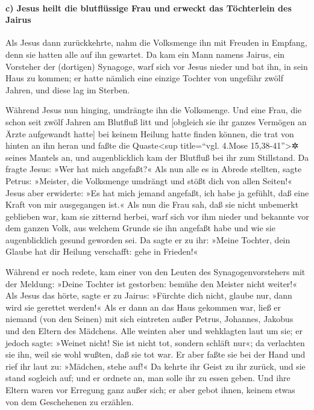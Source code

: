 \hypertarget{c-jesus-heilt-die-blutfluxfcssige-frau-und-erweckt-das-tuxf6chterlein-des-jairus}{%
\paragraph{c) Jesus heilt die blutflüssige Frau und erweckt das
Töchterlein des
Jairus}\label{c-jesus-heilt-die-blutfluxfcssige-frau-und-erweckt-das-tuxf6chterlein-des-jairus}}

 Als Jesus dann zurückkehrte, nahm die Volksmenge ihn mit
Freuden in Empfang, denn sie hatten alle auf ihn gewartet.
 Da kam ein Mann namens Jairus, ein Vorsteher der
(dortigen) Synagoge, warf sich vor Jesus nieder und bat ihn, in sein
Haus zu kommen;  er hatte nämlich eine einzige Tochter
von ungefähr zwölf Jahren, und diese lag im Sterben.

Während Jesus nun hinging, umdrängte ihn die Volksmenge. 
Und eine Frau, die schon seit zwölf Jahren am Blutfluß litt und
{[}obgleich sie ihr ganzes Vermögen an Ärzte aufgewandt hatte{]} bei
keinem Heilung hatte finden können,  die trat von hinten
an ihn heran und faßte die Quaste\textless sup title=``vgl. 4.Mose
15,38-41''\textgreater✲ seines Mantels an, und augenblicklich kam der
Blutfluß bei ihr zum Stillstand.  Da fragte Jesus: »Wer
hat mich angefaßt?« Als nun alle es in Abrede stellten, sagte Petrus:
»Meister, die Volksmenge umdrängt und stößt dich von allen Seiten!«
 Jesus aber erwiderte: »Es hat mich jemand angefaßt, ich
habe ja gefühlt, daß eine Kraft von mir ausgegangen ist.«
 Als nun die Frau sah, daß sie nicht unbemerkt geblieben
war, kam sie zitternd herbei, warf sich vor ihm nieder und bekannte vor
dem ganzen Volk, aus welchem Grunde sie ihn angefaßt habe und wie sie
augenblicklich gesund geworden sei.  Da sagte er zu ihr:
»Meine Tochter, dein Glaube hat dir Heilung verschafft: gehe in
Frieden!«

 Während er noch redete, kam einer von den Leuten des
Synagogenvorstehers mit der Meldung: »Deine Tochter ist gestorben:
bemühe den Meister nicht weiter!«  Als Jesus das hörte,
sagte er zu Jairus: »Fürchte dich nicht, glaube nur, dann wird sie
gerettet werden!«  Als er dann an das Haus gekommen war,
ließ er niemand (von den Seinen) mit sich eintreten außer Petrus,
Johannes, Jakobus und den Eltern des Mädchens.  Alle
weinten aber und wehklagten laut um sie; er jedoch sagte: »Weinet nicht!
Sie ist nicht tot, sondern schläft nur«;  da verlachten
sie ihn, weil sie wohl wußten, daß sie tot war.  Er aber
faßte sie bei der Hand und rief ihr laut zu: »Mädchen, stehe auf!«
 Da kehrte ihr Geist zu ihr zurück, und sie stand
sogleich auf; und er ordnete an, man solle ihr zu essen geben.
 Und ihre Eltern waren vor Erregung ganz außer sich; er
aber gebot ihnen, keinem etwas von dem Geschehenen zu erzählen.

